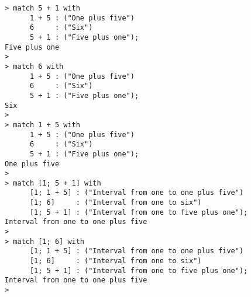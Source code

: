 \begin{center}\begin{minipage}{15cm}\begin{Verbatim}[frame=single]
> match 5 + 1 with 
      1 + 5 : ("One plus five")
      6     : ("Six")
      5 + 1 : ("Five plus one");
Five plus one
> 
> match 6 with 
      1 + 5 : ("One plus five")
      6     : ("Six")
      5 + 1 : ("Five plus one");
Six
>   
> match 1 + 5 with 
      1 + 5 : ("One plus five")
      6     : ("Six")
      5 + 1 : ("Five plus one");
One plus five
> 
> match [1; 5 + 1] with
      [1; 1 + 5] : ("Interval from one to one plus five")
      [1; 6]     : ("Interval from one to six")
      [1; 5 + 1] : ("Interval from one to five plus one");
Interval from one to one plus five
> 
> match [1; 6] with
      [1; 1 + 5] : ("Interval from one to one plus five")
      [1; 6]     : ("Interval from one to six")
      [1; 5 + 1] : ("Interval from one to five plus one");
Interval from one to one plus five
> 
\end{Verbatim}
\end{minipage}\end{center}
